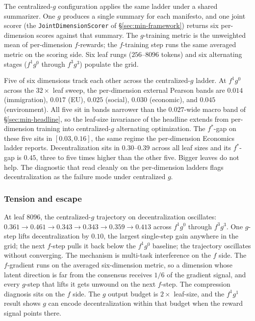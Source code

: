 The centralized-$g$ configuration applies the same ladder under a
shared summarizer. One $g$ produces a single summary for each
manifesto, and one joint scorer (the
\texttt{JointDimensionScorer} of \S\ref{sec:min-framework}) returns
six per-dimension scores against that summary. The $g$-training metric
is the unweighted mean of per-dimension $f$-rewards; the $f$-training
step runs the same averaged metric on the scoring side. Six leaf
rungs ($256$--$8096$ tokens) and six alternating stages ($f^1g^0$
through $f^3g^3$) populate the grid.

Five of six dimensions track each other across the centralized-$g$
ladder. At $f^1g^0$ across the $32\times$ leaf sweep, the
per-dimension external Pearson bands are $0.014$ (immigration), $0.017$
(EU), $0.025$ (social), $0.030$ (economic), and $0.045$ (environment).
All five sit in bands narrower than the $0.027$-wide macro band of
\S\ref{sec:min-headline}, so the leaf-size invariance of the headline
extends from per-dimension training into centralized-$g$ alternating
optimization. The $f^*$-gap on these five sits in $[0.03, 0.16]$, the
same regime the per-dimension Economics ladder reports. Decentralization
sits in $0.30$--$0.39$ across all leaf sizes and its $f^*$-gap is
$0.45$, three to five times higher than the other five. Bigger leaves
do not help. The diagnostic that read cleanly on the per-dimension
ladders flags decentralization as the failure mode under centralized
$g$.

\subsubsection*{Tension and escape}\label{sec:min-fg-tension}


At leaf $8096$, the centralized-$g$ trajectory on decentralization
oscillates: $0.361 \to 0.461 \to 0.343 \to 0.343 \to 0.359 \to 0.413$
across $f^1g^0$ through $f^3g^3$. One $g$-step lifts decentralization
by $0.10$, the largest single-step gain anywhere in the grid; the next
$f$-step pulls it back below the $f^1g^0$ baseline; the trajectory
oscillates without converging. The mechanism is multi-task interference
on the $f$ side. The $f$-gradient runs on the averaged six-dimension
metric, so a dimension whose latent direction is far from the consensus
receives $1/6$ of the gradient signal, and every $g$-step that lifts
it gets unwound on the next $f$-step. The compression diagnosis sits
on the $f$ side. The $g$ output budget is $2\times$ leaf-size, and
the $f^1g^1$ result shows $g$ can encode decentralization within that
budget when the reward signal points there.

